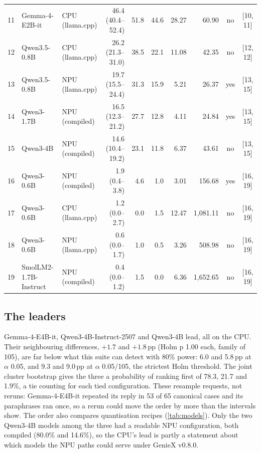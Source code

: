 \documentclass[11pt]{article}
\newenvironment{widetab}{\begin{lrbox}{\widetabbox}}{\end{lrbox}\resizebox{\linewidth}{!}{\usebox{\widetabbox}}}
\begin{document}
\begin{table}[tbp]
\begin{widetab}
\begin{tabular}{@{}rllrrrrrcc@{}}
11 & Gemma-4-E2B-it & CPU (llama.cpp) & 46.4 (40.4--52.4) & 51.8 & 44.6 & 28.27 & 60.90 & no & [10, 11] \\
12 & Qwen3.5-0.8B & CPU (llama.cpp) & 26.2 (21.3--31.0) & 38.5 & 22.1 & 11.08 & 42.35 & no & [12, 12] \\
13 & Qwen3.5-0.8B & NPU (llama.cpp) & 19.7 (15.5--24.4) & 31.3 & 15.9 & 5.21 & 26.37 & yes & [13, 15] \\
14 & Qwen3-1.7B & NPU (compiled) & 16.5 (12.3--21.2) & 27.7 & 12.8 & 4.11 & 24.84 & yes & [13, 15] \\
15 & Qwen3-4B & NPU (compiled) & 14.6 (10.4--19.2) & 23.1 & 11.8 & 6.37 & 43.61 & no & [13, 15] \\
16 & Qwen3-0.6B & NPU (compiled) & 1.9 (0.4--3.8) & 4.6 & 1.0 & 3.01 & 156.68 & yes & [16, 19] \\
17 & Qwen3-0.6B & CPU (llama.cpp) & 1.2 (0.0--2.7) & 0.0 & 1.5 & 12.47 & 1,081.11 & no & [16, 19] \\
18 & Qwen3-0.6B & NPU (llama.cpp) & 0.6 (0.0--1.7) & 1.0 & 0.5 & 3.26 & 508.98 & no & [16, 19] \\
19 & SmolLM2-1.7B-Instruct & NPU (compiled) & 0.4 (0.0--1.2) & 1.5 & 0.0 & 6.36 & 1,652.65 & no & [16, 19] \\
\bottomrule
\end{tabular}
\end{widetab}
\end{table}

\subsection{The leaders}\label{sec:leaders}

Gemma-4-E4B-it, Qwen3-4B-Instruct-2507 and Qwen3-4B lead, all on the CPU. Their neighbouring differences, $+1.7$ and $+1.8$\,pp (Holm p 1.00 each, family of 105), are far below what this suite can detect with 80\% power: 6.0 and 5.8\,pp at $\alpha$ 0.05, and 9.3 and 9.0\,pp at $\alpha$ 0.05/105, the strictest Holm threshold. The joint cluster bootstrap gives the three a probability of ranking first of 78.3, 21.7 and 1.9\%, a tie counting for each tied configuration. These resample requests, not reruns: Gemma-4-E4B-it repeated its reply in 53 of 65 canonical cases and its paraphrases ran once, so a rerun could move the order by more than the intervals show. The order also compares quantisation recipes (\cref{tab:models}). Only the two Qwen3-4B models among the three had a readable NPU configuration, both compiled (80.0\% and 14.6\%), so the CPU's lead is partly a statement about which models the NPU paths could serve under GenieX v0.8.0.
\end{document}
